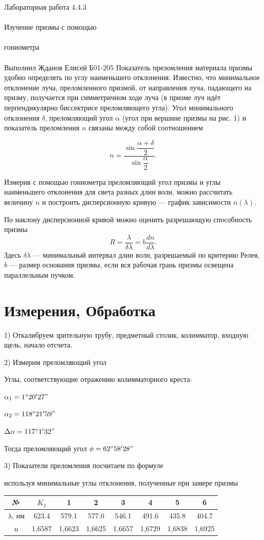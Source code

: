 \documentclass{astroedu-lab}
\begin{document}
\begin{problem}{\huge Лабораторная работа 4.4.3\\\\Изучение призмы с помощью\\\\гониометра\\\\Выполнил Жданов Елисей Б01-205}
Показатель преломления материала призмы удобно определять по углу наименьшего отклонения. Известно, что минимальное отклонение луча, преломленного призмой, от направления луча, падающего на призму, получается при симметричном ходе луча (в призме луч идёт перпендикулярно биссектрисе преломляющего угла). Угол минимального отклонения $\delta$, преломляющий угол $\alpha$ (угол при вершине призмы на рис. 1) и показатель преломления $n$ связаны между собой соотношением

\begin{equation}
	n=\dfrac{\sin\dfrac{\alpha+\delta}{2}}{\sin\dfrac{\alpha}{2}}.
\end{equation}

Измерив с помощью гониометра преломляющий угол призмы и углы наименьшего отклонения для света разных длин волн, можно рассчитать величину $n$ и построить дисперсионную кривую --- график зависимости $n(\lambda)$. 
	
По наклону дисперсионной кривой можно оценить разрешающую
	способность призмы
	\begin{equation}
	R = \dfrac{\lambda}{\delta\lambda} = b\dfrac{dn}{d\lambda}.
	\end{equation}
	Здесь $\delta\lambda$ --- минимальный интервал длин волн, разрешаемый по критерию Релея, $b$ --- размер основания призмы, если вся рабочая грань призмы освещена параллельным пучком.

\section{Измерения, Обработка}

1) Откалибруем зрительную трубу, предметный столик, колимматор, входную щель, начало отсчета.

2) Измерим преломляющий угол

Углы, соответствующие отражению колимматорного креста:

$\alpha_1 = 1^\circ 20' 27"$

$\alpha_2 = 118^\circ 21' 59"$

$\Delta \alpha = 117^\circ 1' 32"$

Тогда преломляющий угол $\phi = 62^\circ 58' 28"$

3) Показатели преломления посчитаем по формуле



используя минимальные углы отклонения, полученные при замере призмы

\begin{center}
\begin{tabular}{|c|c|c|c|c|c|c|c|}
\hline 
№ & $K_1$ & 1 & 2 & 3 & 4 & 5 & 6 \\
\hline
$\lambda$, нм & 623.4 & 579.1 & 577.0 & 546.1 & 491.6 & 435.8 & 404.7 \\
\hline
n & 1,6587 & 1,6623 & 1,6625 & 1,6657 & 1,6729 & 1,6838 & 1,6925 \\
\hline
\end{tabular}
\end{center}


\end{problem}
\end{document}
